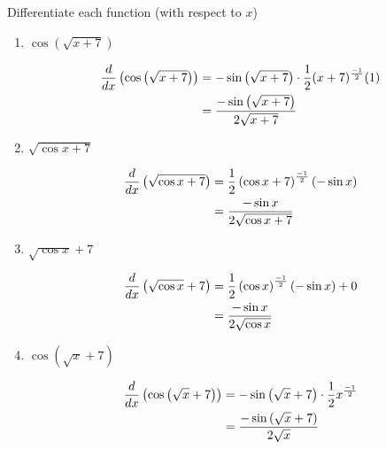 \documentclass[nooutcomes,handout]{ximera}
\begin{document}
\begin{problem}
Differentiate each function (with respect to $x$)
	\begin{enumerate}
	
	\item  $\cos \left( \sqrt{x+7} \right) $
		\begin{freeResponse}
		\begin{align*}
		\frac{d}{dx} \left( \cos \left( \sqrt{x+7} \right) \right) &= -\sin \left( \sqrt{x+7} \right) \cdot \frac{1}{2} (x+7)^{\frac{-1}{2}} (1) \\
		&= \frac{-\sin \left( \sqrt{x+7} \right) }{2 \sqrt{x+7}}
		\end{align*}
		\end{freeResponse}
		
	\item  $\sqrt{ \cos x + 7}$
		\begin{freeResponse}
		\begin{align*}
		\frac{d}{dx} \left( \sqrt{ \cos x + 7} \right) &= \frac{1}{2} \left( \cos x + 7 \right)^{\frac{-1}{2}} \left( -\sin x \right) \\
		&= \frac{- \sin x }{2 \sqrt{\cos x + 7 }}
		\end{align*}
		\end{freeResponse}
		
	\item $\sqrt{\cos x} + 7$
		\begin{freeResponse}
		\begin{align*}
		\frac{d}{dx} \left( \sqrt{\cos x} + 7 \right) &=  \frac{1}{2} \left( \cos x \right)^{\frac{-1}{2}} \left( -\sin x \right) + 0  \\
		&= \frac{- \sin x}{2 \sqrt{\cos x}}
		\end{align*}
		\end{freeResponse}
		
	\item  $\cos \left( \sqrt{x} + 7 \right)$
		\begin{freeResponse}
		\begin{align*}
		\frac{d}{dx} \left( \cos \left( \sqrt{x} + 7 \right) \right) &= - \sin \left( \sqrt{x} + 7 \right) \cdot \frac{1}{2} x^{\frac{-1}{2}} \\
		&=  \frac{- \sin \left( \sqrt{x} + 7 \right) }{2 \sqrt{x}}
		\end{align*}
		\end{freeResponse}
	\end{enumerate}
		
		
		
		
\end{problem}
\end{document}

